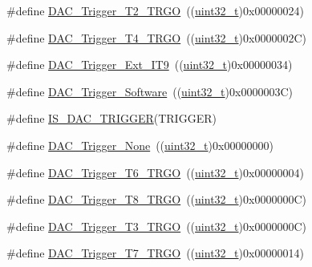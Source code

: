 \begin{DoxyCompactItemize}
\#define \hyperlink{group___d_a_c__trigger__selection_ga3bfbff1e03af1fd17a57a43e57420fe6}{D\+A\+C\+\_\+\+Trigger\+\_\+\+T2\+\_\+\+T\+R\+GO}~((\hyperlink{_p_e___types_8h_a33594304e786b158f3fb30289278f5af}{uint32\+\_\+t})0x00000024)
\item 
\#define \hyperlink{group___d_a_c__trigger__selection_ga58ccb2de3d22d66ee975152f5edb330a}{D\+A\+C\+\_\+\+Trigger\+\_\+\+T4\+\_\+\+T\+R\+GO}~((\hyperlink{_p_e___types_8h_a33594304e786b158f3fb30289278f5af}{uint32\+\_\+t})0x0000002\+C)
\item 
\#define \hyperlink{group___d_a_c__trigger__selection_ga67c15b2c26246a2304f9db28e25adcc4}{D\+A\+C\+\_\+\+Trigger\+\_\+\+Ext\+\_\+\+I\+T9}~((\hyperlink{_p_e___types_8h_a33594304e786b158f3fb30289278f5af}{uint32\+\_\+t})0x00000034)
\item 
\#define \hyperlink{group___d_a_c__trigger__selection_gadef77bb8bbd109232900902402ef637f}{D\+A\+C\+\_\+\+Trigger\+\_\+\+Software}~((\hyperlink{_p_e___types_8h_a33594304e786b158f3fb30289278f5af}{uint32\+\_\+t})0x0000003\+C)
\item 
\#define \hyperlink{group___d_a_c__trigger__selection_ga4409b79639e6ae3b1f0ed61a33c810a3}{I\+S\+\_\+\+D\+A\+C\+\_\+\+T\+R\+I\+G\+G\+ER}(T\+R\+I\+G\+G\+ER)
\item 
\#define \hyperlink{group___d_a_c__trigger__selection_ga7849138e043267668d755390d923e4ba}{D\+A\+C\+\_\+\+Trigger\+\_\+\+None}~((\hyperlink{_p_e___types_8h_a33594304e786b158f3fb30289278f5af}{uint32\+\_\+t})0x00000000)
\item 
\#define \hyperlink{group___d_a_c__trigger__selection_ga083307783678a2f1d3066db57dc84cfe}{D\+A\+C\+\_\+\+Trigger\+\_\+\+T6\+\_\+\+T\+R\+GO}~((\hyperlink{_p_e___types_8h_a33594304e786b158f3fb30289278f5af}{uint32\+\_\+t})0x00000004)
\item 
\#define \hyperlink{group___d_a_c__trigger__selection_ga756700c6621eadb807e21a16966580a0}{D\+A\+C\+\_\+\+Trigger\+\_\+\+T8\+\_\+\+T\+R\+GO}~((\hyperlink{_p_e___types_8h_a33594304e786b158f3fb30289278f5af}{uint32\+\_\+t})0x0000000\+C)
\item 
\#define \hyperlink{group___d_a_c__trigger__selection_ga82cbaedc35164c8b9fe0be2faec9b909}{D\+A\+C\+\_\+\+Trigger\+\_\+\+T3\+\_\+\+T\+R\+GO}~((\hyperlink{_p_e___types_8h_a33594304e786b158f3fb30289278f5af}{uint32\+\_\+t})0x0000000\+C)
\item 
\#define \hyperlink{group___d_a_c__trigger__selection_ga9b92d497746be54af46ae4e9c1fc4a6f}{D\+A\+C\+\_\+\+Trigger\+\_\+\+T7\+\_\+\+T\+R\+GO}~((\hyperlink{_p_e___types_8h_a33594304e786b158f3fb30289278f5af}{uint32\+\_\+t})0x00000014)

\end{DoxyCompactItemize}
